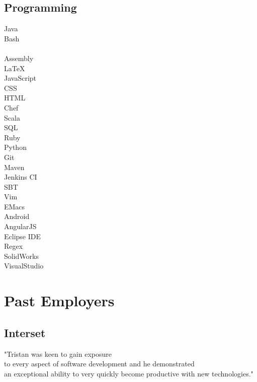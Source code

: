 \documentclass[letterpaper]{deedy-resume-modified} %
\begin{document}
\begin{minipage}[t]{0.33\textwidth}
\subsection{Programming}
Java \tab {\bf + + + + +}\\
Bash \tab {\bf + + + + +}\\
\CPP \tab {\bf + + + +}\\
Assembly \tab {\bf + + +}\\
\LaTeX \tab {\bf + + +}\\
JavaScript \tab {\bf + + +}\\
CSS \tab {\bf + + +}\\
HTML \tab {\bf + + +}\\
Chef \tab {\bf + + +}\\
Scala \tab {\bf + + +}\\
SQL \tab {\bf + + +}\\
Ruby \tab {\bf + +}\\
Python \tab {\bf + +}\\

\sectionspace
{}
Git \tab {\bf + + + + +}\\
Maven \tab {\bf + + + + +}\\
Jenkins CI \tab {\bf + + + +}\\
SBT \tab {\bf + + + +}\\
Vim \tab {\bf + + + +}\\
EMacs \tab {\bf + + +}\\
Android \tab {\bf + + +}\\
AngularJS \tab {\bf + + +}\\
Eclipse IDE \tab {\bf + + +}\\
Regex \tab {\bf + +}\\
SolidWorks \tab {\bf + +}\\
VisualStudio \tab {\bf + +}\\

\sectionspace


\section{Past Employers}
\subsection{Interset}
"Tristan was keen to gain exposure\\to every aspect of software development and he demonstrated\\an exceptional ability to very quickly become productive with new technologies." \\

\end{minipage} %
\end{document}
